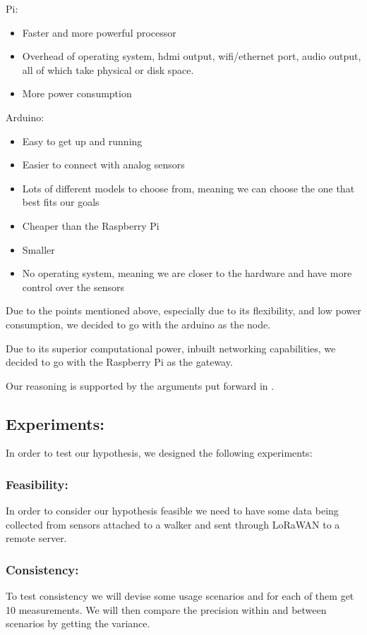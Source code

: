 Pi:
\begin{itemize}
	\item Faster and more powerful processor
	\item Overhead of operating system, hdmi output, wifi/ethernet port, audio output, all of which take physical or disk space.
	\item More power consumption
\end{itemize}

Arduino:
\begin{itemize}
	\item Easy to get up and running
	\item Easier to connect with analog sensors
	\item Lots of different models to choose from, meaning we can choose the one that best fits our goals
	\item Cheaper than the Raspberry Pi
	\item Smaller 
	\item No operating system, meaning we are closer to the hardware and have more control over the sensors
\end{itemize}



Due to the points mentioned above, especially due to its flexibility, and low power consumption, we decided to go with the arduino as the node.

Due to its superior computational power, inbuilt networking capabilities, we decided to go with the Raspberry Pi as the gateway.

Our reasoning is supported by the arguments put forward in \cite{postolache2011smart}.


\subsection{Experiments:}
In order to test our hypothesis, we designed the following experiments:

\subsubsection{Feasibility:}
In order to consider our hypothesis feasible we need to have some data being collected from sensors attached to a walker and sent through LoRaWAN to a remote server.

\subsubsection{Consistency:}
To test consistency we will devise some usage scenarios and for each of them get 10 measurements. We will then compare the precision within and between scenarios by getting the variance.


